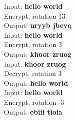 \documentclass[11pt]{report}
\begin{document}
Input: {\bf hello world} \\
Encrypt, rotation 13 \\
Output: {\bf uryyb jbeyq} \\

Input: {\bf hello world} \\
Encrypt, rotation 3 \\
Output: {\bf khoor zruog} \\

Input: {\bf khoor zruog} \\
Decrypt, rotation 3 \\
Output: {\bf hello world} \\

Input: {\bf hello world} \\
Encrypt, rotation -3 \\
Output: {\bf ebiil tloia} \\

\newpage
\end{document}
